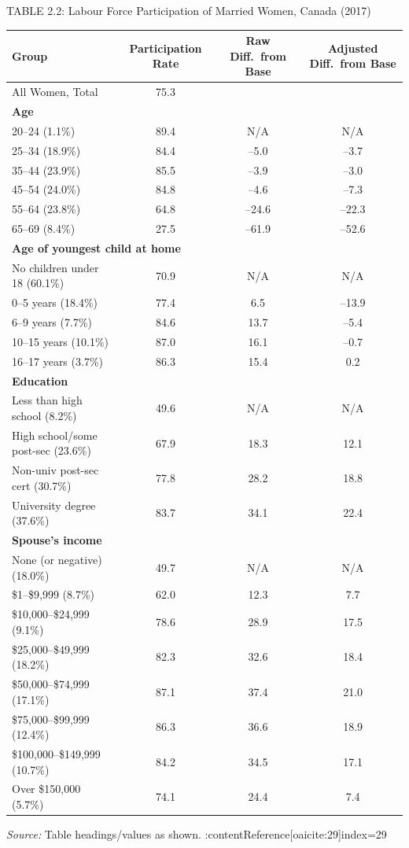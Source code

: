 \documentclass[aspectratio=169]{beamer}
\begin{document}
\begin{frame}{TABLE 2.2: Labour Force Participation of Married Women, Canada (2017)}
\transfade
\tiny
\begin{tabular}{lccc}
\toprule
\textbf{Group} & \textbf{Participation Rate} & \textbf{Raw Diff.\ from Base} & \textbf{Adjusted Diff.\ from Base} \\
\midrule
All Women, Total & 75.3 &  &  \\
\midrule
\multicolumn{4}{l}{\textbf{Age}} \\
20--24 (1.1\%) & 89.4 & N/A & N/A \\
25--34 (18.9\%) & 84.4 & --5.0 & --3.7 \\
35--44 (23.9\%) & 85.5 & --3.9 & --3.0 \\
45--54 (24.0\%) & 84.8 & --4.6 & --7.3 \\
55--64 (23.8\%) & 64.8 & --24.6 & --22.3 \\
65--69 (8.4\%) & 27.5 & --61.9 & --52.6 \\
\midrule
\multicolumn{4}{l}{\textbf{Age of youngest child at home}} \\
No children under 18 (60.1\%) & 70.9 & N/A & N/A \\
0--5 years (18.4\%) & 77.4 & 6.5 & --13.9 \\
6--9 years (7.7\%) & 84.6 & 13.7 & --5.4 \\
10--15 years (10.1\%) & 87.0 & 16.1 & --0.7 \\
16--17 years (3.7\%) & 86.3 & 15.4 & 0.2 \\
\midrule
\multicolumn{4}{l}{\textbf{Education}} \\
Less than high school (8.2\%) & 49.6 & N/A & N/A \\
High school/some post-sec (23.6\%) & 67.9 & 18.3 & 12.1 \\
Non-univ post-sec cert (30.7\%) & 77.8 & 28.2 & 18.8 \\
University degree (37.6\%) & 83.7 & 34.1 & 22.4 \\
\midrule
\multicolumn{4}{l}{\textbf{Spouse's income}} \\
None (or negative) (18.0\%) & 49.7 & N/A & N/A \\
\$1--\$9{,}999 (8.7\%) & 62.0 & 12.3 & 7.7 \\
\$10{,}000--\$24{,}999 (9.1\%) & 78.6 & 28.9 & 17.5 \\
\$25{,}000--\$49{,}999 (18.2\%) & 82.3 & 32.6 & 18.4 \\
\$50{,}000--\$74{,}999 (17.1\%) & 87.1 & 37.4 & 21.0 \\
\$75{,}000--\$99{,}999 (12.4\%) & 86.3 & 36.6 & 18.9 \\
\$100{,}000--\$149{,}999 (10.7\%) & 84.2 & 34.5 & 17.1 \\
Over \$150{,}000 (5.7\%) & 74.1 & 24.4 & 7.4 \\
\bottomrule
\end{tabular}

\vspace{0.25em}
\tiny {\it Source:} Table headings/values as shown. :contentReference[oaicite:29]{index=29}
\end{frame}
\end{document}

